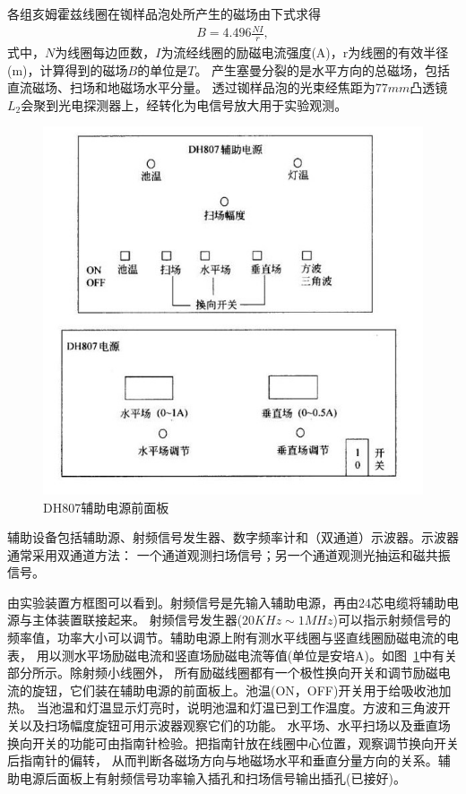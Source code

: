 \documentclass[11pt,a4paper]{article}
\begin{document}
\begin{spacing}{1.3}
\begin{CJK*}{UTF8}{gbsn}
\begin{enumerate}
各组亥姆霍兹线圈在铷样品泡处所产生的磁场由下式求得
\begin{eqnarray} \label{2-6-10}
B=4.496 \frac{NI}{r},
\end{eqnarray}
式中，$N$为线圈每边匝数，$I$为流经线圈的励磁电流强度(A)，r为线圈的有效半径(m)，计算得到的磁场$B$的单位是$T$。
产生塞曼分裂的是水平方向的总磁场，包括直流磁场、扫场和地磁场水平分量。
  透过铷样品泡的光束经焦距为$77 mm$凸透镜$L_2$会聚到光电探测器上，经转化为电信号放大用于实验观测。
\begin{figure}[ht]
\centering
\includegraphics[width=.8\textwidth]{added}
\caption{DH807辅助电源前面板}
\label{fig3.9}
\end{figure}
  辅助设备包括辅助源、射频信号发生器、数字频率计和（双通道）示波器。示波器通常采用双通道方法：
一个通道观测扫场信号；另一个通道观测光抽运和磁共振信号。
\par
由实验装置方框图可以看到。射频信号是先输入辅助电源，再由24芯电缆将辅助电源与主体装置联接起来。
射频信号发生器($20KHz\sim 1MHz$)可以指示射频信号的频率值，功率大小可以调节。辅助电源上附有测水平线圈与竖直线圈励磁电流的电表，
用以测水平场励磁电流和竖直场励磁电流等值(单位是安培A)。如图~\ref{fig3.9}中有关部分所示。除射频小线圈外，
所有励磁线圈都有一个极性换向开关和调节励磁电流的旋钮，它们装在辅助电源的前面板上。池温(ON，OFF)开关用于给吸收池加热。
当池温和灯温显示灯亮时，说明池温和灯温已到工作温度。方波和三角波开关以及扫场幅度旋钮可用示波器观察它们的功能。
水平场、水平扫场以及垂直场换向开关的功能可由指南针检验。把指南针放在线圈中心位置，观察调节换向开关后指南针的偏转，
从而判断各磁场方向与地磁场水平和垂直分量方向的关系。辅助电源后面板上有射频信号功率输入插孔和扫场信号输出插孔(已接好)。
\end{enumerate}


\end{CJK*}
\end{spacing}
\end{document}
